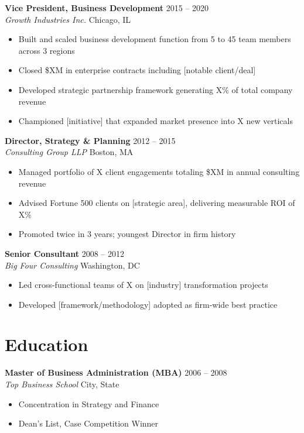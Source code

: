 \documentclass[11pt,a4paper]{article}
\newcommand{\entry}[4]{%
    \noindent\textbf{#1} \hfill {\small #2} \\
    \textit{#3} \hfill {\small #4}%
}
\begin{document}
\vspace{0.5em}

\entry{Vice President, Business Development}{2015 -- 2020}{Growth Industries Inc.}{Chicago, IL}
\begin{itemize}[leftmargin=1.5em, itemsep=0.2em, topsep=0.3em]
    \item Built and scaled business development function from 5 to 45 team members across 3 regions
    \item Closed \$XM in enterprise contracts including [notable client/deal]
    \item Developed strategic partnership framework generating X\% of total company revenue
    \item Championed [initiative] that expanded market presence into X new verticals
\end{itemize}

\vspace{0.5em}

\entry{Director, Strategy \& Planning}{2012 -- 2015}{Consulting Group LLP}{Boston, MA}
\begin{itemize}[leftmargin=1.5em, itemsep=0.2em, topsep=0.3em]
    \item Managed portfolio of X client engagements totaling \$XM in annual consulting revenue
    \item Advised Fortune 500 clients on [strategic area], delivering measurable ROI of X\%
    \item Promoted twice in 3 years; youngest Director in firm history
\end{itemize}

\vspace{0.5em}

\entry{Senior Consultant}{2008 -- 2012}{Big Four Consulting}{Washington, DC}
\begin{itemize}[leftmargin=1.5em, itemsep=0.2em, topsep=0.3em]
    \item Led cross-functional teams of X on [industry] transformation projects
    \item Developed [framework/methodology] adopted as firm-wide best practice
\end{itemize}

\section{Education}

\entry{Master of Business Administration (MBA)}{2006 -- 2008}{Top Business School}{City, State}
\begin{itemize}[leftmargin=1.5em, itemsep=0.2em, topsep=0.3em]
    \item Concentration in Strategy and Finance
    \item Dean's List, Case Competition Winner
\end{itemize}
\end{document}
